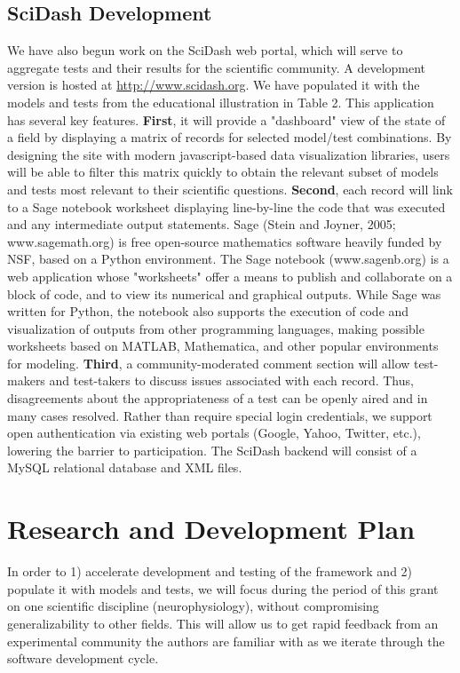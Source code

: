 \documentclass[11pt,letterpaper]{article}
\begin{document}
\subsection{SciDash Development}
We have also begun work on the SciDash web portal, which will serve to aggregate tests and their results for the scientific community. A development version is hosted at \url{http://www.scidash.org}.  We have populated it with the models and tests from the educational illustration in Table 2.  This application has several key features.  \textbf{First}, it will provide a "dashboard" view of the state of a field by displaying a matrix of records for selected model/test combinations.  By designing the site with modern javascript-based data visualization libraries, users will be able to filter this matrix quickly to obtain the relevant subset of models and tests most relevant to their scientific questions.  \textbf{Second}, each record will link to a Sage notebook worksheet displaying line-by-line the code that was executed and any intermediate output statements.  Sage (Stein and Joyner, 2005; www.sagemath.org) is free open-source mathematics software heavily funded by NSF, based on a Python environment.  The Sage notebook (www.sagenb.org) is a web application whose "worksheets" offer a means to publish and collaborate on a block of code, and to view its numerical and graphical outputs.  While Sage was written for Python, the notebook also supports the execution of code and visualization of outputs from other programming languages, making possible worksheets based on MATLAB, Mathematica, and other popular environments for modeling.  \textbf{Third}, a community-moderated comment section will allow test-makers and test-takers to discuss issues associated with each record.  Thus, disagreements about the appropriateness of a test can be openly aired and in many cases resolved.  Rather than require special login credentials, we support open authentication via existing web portals (Google, Yahoo, Twitter, etc.), lowering the barrier to participation.  The SciDash backend will consist of a MySQL relational database and XML files.  

\section{Research and Development Plan}
In order to 1) accelerate development and testing of the framework and 2) populate it with models and tests, we will focus during the period of this grant on one scientific discipline (neurophysiology), without compromising generalizability to other fields. This will allow us to get rapid feedback from an experimental community the authors are familiar with as we iterate through the software development cycle.  
\end{document}
